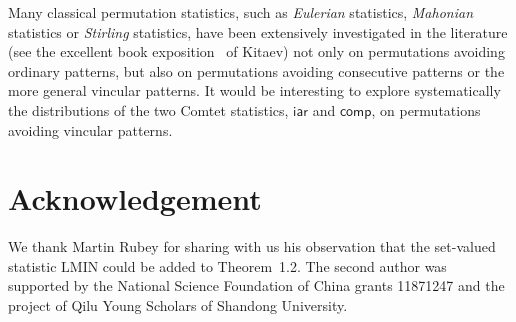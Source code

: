 \documentclass[12pt]{amsart}
\numberwithin{equation}{section}
\theoremstyle{plain}
\theoremstyle{definition}
\def\iar{\mathsf{iar}}
\def\comp{\mathsf{comp}}
\def\LMIN{\mathrm{LMIN}}
\def\LMIN{\mathrm{LMIN}}
\begin{document}
Many classical permutation statistics, such as {\em Eulerian} statistics, {\em Mahonian} statistics or {\em Stirling} statistics, have been extensively investigated in the literature (see the excellent book exposition~\cite{kit} of Kitaev) not only on permutations avoiding ordinary  patterns, but also on permutations avoiding consecutive patterns or the more general vincular patterns. It would be interesting to explore systematically the distributions of the two Comtet statistics, $\iar$ and $\comp$, on permutations avoiding vincular patterns.



\section*{Acknowledgement}%
We thank Martin Rubey for sharing with us his observation that  the set-valued statistic $\LMIN$ could be added to Theorem~1.2.
The second author was supported
by the National Science Foundation of China grants 11871247 and the project of Qilu Young Scholars of Shandong University.
\end{document}
